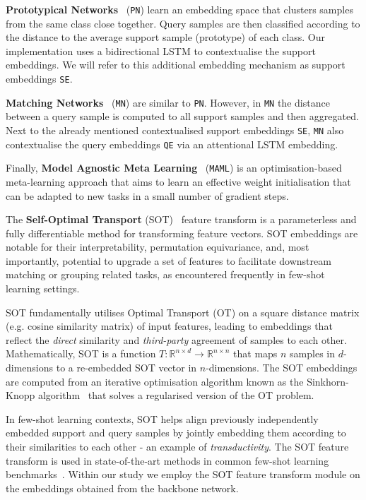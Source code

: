 \textbf{Prototypical Networks}~\cite{protonet} (\texttt{PN}) learn an embedding space that clusters samples from the same class close together. Query samples are then classified according to the distance to the average support sample (prototype) of each class.  Our implementation uses a bidirectional LSTM to contextualise the support embeddings. We will refer to this additional embedding mechanism as support embeddings \texttt{SE}.

\textbf{Matching Networks}~\cite{matchingnet} (\texttt{MN}) are similar to \texttt{PN}. However, in \texttt{MN} the distance between a query sample is computed to all support samples and then aggregated. Next to the already mentioned contextualised support embeddings \texttt{SE}, \texttt{MN} also contextualise the query embeddings \texttt{QE} via an attentional LSTM embedding.

Finally, \textbf{Model Agnostic Meta Learning}~\cite{maml} (\texttt{MAML}) is an optimisation-based meta-learning approach that aims to learn an effective weight initialisation that can be adapted to new tasks in a small number of gradient steps.


The \textbf{Self-Optimal Transport} (SOT)~\cite{sot} feature transform is a parameterless and fully differentiable method for transforming feature vectors. SOT embeddings are notable for their interpretability, permutation equivariance, and, most importantly, potential to upgrade a set of features to facilitate downstream matching or grouping related tasks, as encountered frequently in few-shot learning settings.

SOT fundamentally utilises Optimal Transport (OT) on a square distance matrix (e.g. cosine similarity matrix) of input features, leading to embeddings that reflect the \textit{direct} similarity and \textit{third-party} agreement of samples to each other. Mathematically, SOT is a function \(T: \mathbb{R}^{n \times d} \rightarrow \mathbb{R}^{n \times n}\) that maps \(n\) samples in \(d\)-dimensions to a re-embedded SOT vector in \(n\)-dimensions. The SOT embeddings are computed from an iterative optimisation algorithm known as the Sinkhorn-Knopp algorithm~\cite{sinkhorn-knopp} that solves a regularised version of the OT problem.

In few-shot learning contexts, SOT helps align previously independently embedded support and query samples by jointly embedding them according to their similarities to each other - an example of \textit{transductivity}. The SOT feature transform is used in state-of-the-art methods in common few-shot learning benchmarks~\cite{sot}. Within our study we employ the SOT feature transform module on the embeddings obtained from the backbone network.

